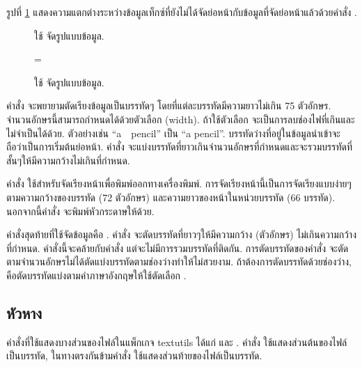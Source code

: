\begin{thwbr}
รูปที่ \ref{fig:fmt} แสดงความแตกต่างระหว่างข้อมูลเท็กซ์ที่ยังไม่ได้จัดย่อหน้ากับข้อมูลที่จัดย่อหน้าแล้วด้วยคำสั่ง .

\begin{figure}[!htb]
\ifthenelse{\isodd{\pageref{fig:fmt}}}%
{\parbox{\headwidth}{\center{}\caption{ใช้  จัดรูปแบบข้อมูล.}\label{fig:fmt}}}%
{\leftskip=\moveback\parbox{\headwidth}{\center{}\caption{ใช้  จัดรูปแบบข้อมูล.}\label{fig:fmt}}}
\end{figure}

คำสั่ง  จะพยายามตัดเรียงข้อมูลเป็นบรรทัดๆ โดยที่แต่ละบรรทัดมีความยาวไม่เกิน 75 ตัวอักษร. จำนวนอักษรนี้สามารถกำหนดได้ด้วยตัวเลือก  (width). ถ้าใช้ตัวเลือก  จะเป็นการลบช่องไฟที่เกินและไม่จำเป็นได้ด้วย. ตัวอย่างเช่น ``a\ \ pencil'' เป็น ``a pencil''. บรรทัดว่างที่อยู่ในข้อมูลนำเข้าจะถือว่าเป็นการเริ่มต้นย่อหน้า. คำสั่ง  จะแบ่งบรรทัดที่ยาวเกินจำนวนอักษรที่กำหนดและจะรวมบรรทัดที่สั้นๆให้มีความกว้างไม่เกินที่กำหนด. 

\medskip
คำสั่ง  ใช้สำหรับจัดเรียงหน้าเพื่อพิมพ์ออกทางเครื่องพิมพ์. การจัดเรียงหน้านี้เป็นการจัดเรียงแบบง่ายๆตามความกว้างของบรรทัด (72 ตัวอักษร) และความยาวของหน้าในหน่วยบรรทัด (66 บรรทัด). นอกจากนี้คำสั่ง  จะพิมพ์หัวกระดาษให้ด้วย. 

\begin{figure}[!tb]
\end{figure}

คำสั่งสุดท้ายที่ใช้จัดข้อมูลคือ . คำสั่ง  จะตัดบรรทัดที่ยาวๆให้มีความกว้าง (ตัวอักษร) ไม่เกินความกว้างที่กำหนด. คำสั่งนี้จะคล้ายกับคำสั่ง  แต่จะไม่มีการรวมบรรทัดที่ติดกัน. การตัดบรรทัดของคำสั่ง  จะตัดตามจำนวนอักษรไม่ได้ตัดแบ่งบรรทัดตามช่องว่างทำให้ไม่สวยงาม. ถ้าต้องการตัดบรรทัดด้วยช่องว่าง, คือตัดบรรทัดแบ่งตามคำภาษาอังกฤษให้ใช้ตัดเลือก .


\subsection{หัวหาง}
คำสั่งที่ใช้แสดงบางส่วนของไฟล์ในแพ็กเกจ textutils ได้แก่  และ . คำสั่ง  ใช้แสดงส่วนต้นของไฟล์เป็นบรรทัด, ในทางตรงกันข้ามคำสั่ง  ใช้แสดงส่วนท้ายของไฟล์เป็นบรรทัด.


\end{thwbr}
